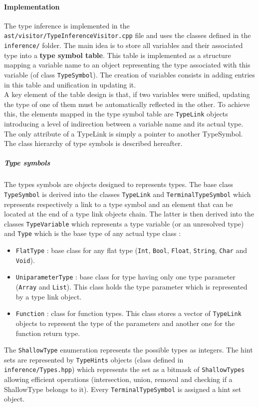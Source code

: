 \documentclass[a4paper,11pt]{article}
\begin{document}
\paragraph{Implementation} The type inference is implemented in the \texttt{ast/visitor/TypeInferenceVisitor.cpp} file and uses the classes defined in the \texttt{inference/} folder. The main idea is to store all variables and their associated type into a \textbf{type symbol table}. This table is implemented as a structure mapping a variable name to an object representing the type associated with this variable (of class \texttt{TypeSymbol}). The creation of variables consists in adding entries in this table and unification in updating it. \\ 
A key element of the table design is that, if two variables were unified, updating the type of one of them must be automatically reflected in the other. To achieve this, the elements mapped in the type symbol table are \texttt{TypeLink} objects introducing a level of indirection between a variable name and its actual type. The only attribute of a TypeLink is simply a pointer to another TypeSymbol. The class hierarchy of type symbols is described hereafter.
\subparagraph{Type symbols} The types symbols are objects designed to represents types. The base class \texttt{TypeSymbol} is derived into the classes \texttt{TypeLink} and \texttt{TerminalTypeSymbol} which represents respectively a link to a type symbol and an element that can be located at the end of a type link objects chain. The latter is then derived into the classes \texttt{TypeVariable} which represents a type variable (or an unresolved type) and \texttt{Type} which is the base type of any actual type class :
\begin{itemize}
	\item \texttt{FlatType} : base class for any flat type (\texttt{Int}, \texttt{Bool}, \texttt{Float}, \texttt{String}, \texttt{Char} and \texttt{Void}).
	\item \texttt{UniparameterType} : base class for type having only one type parameter (\texttt{Array} and \texttt{List}). This class holds the type parameter which is represented by a type link object. 
	\item \texttt{Function} : class for function types. This class stores a vector of \texttt{TypeLink} objects to represent the type of the parameters and another one for the function return type.
\end{itemize}
The \texttt{ShallowType} enumeration represents the possible types as integers. The hint sets are represented by \texttt{TypeHints} objects (class defined in \texttt{inference/Types.hpp}) which represents the set as a bitmask of \texttt{ShallowTypes} allowing efficient operations (intersection, union, removal and checking if a ShallowType belongs to it). Every \texttt{TerminalTypeSymbol} is assigned a hint set object.
\end{document}

